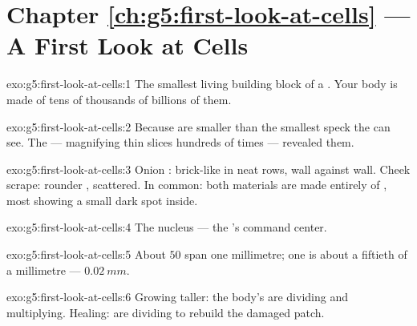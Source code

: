 \section*{Chapter \ref{ch:g5:first-look-at-cells} --- A First Look at Cells}

\begin{solution}{exo:g5:first-look-at-cells:1}
The smallest living building block of a . Your body
is made of tens of thousands of billions of them.
\end{solution}

\begin{solution}{exo:g5:first-look-at-cells:2}
Because  are smaller than the smallest speck the  can
see. The  --- magnifying thin slices hundreds of
times --- revealed them.
\end{solution}

\begin{solution}{exo:g5:first-look-at-cells:3}
Onion : brick-like  in neat rows, wall against wall.
Cheek scrape: rounder , scattered. In common: both
materials are made entirely of , most showing a small
dark spot inside.
\end{solution}

\begin{solution}{exo:g5:first-look-at-cells:4}
The nucleus --- the 's command center.
\end{solution}

\begin{solution}{exo:g5:first-look-at-cells:5}
About $50$  span one millimetre; one  is about a
fiftieth of a millimetre --- $\qty{0.02}{mm}$.
\end{solution}

\begin{solution}{exo:g5:first-look-at-cells:6}
Growing taller: the body's  are dividing and multiplying.
Healing:  are dividing to rebuild the damaged patch.
\end{solution}

